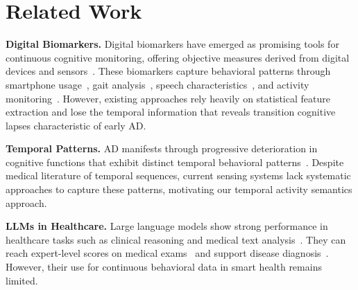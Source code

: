 \documentclass[sigconf, anonymous, 9pt, nonacm]{acmart}
\begin{document}
\vspace{-0.5em}

\section{Related Work}
\label{sec:related}

\noindent\textbf{Digital Biomarkers.}
Digital biomarkers have emerged as promising tools for continuous cognitive monitoring, offering objective measures derived from digital devices and sensors~\cite{Piau2019_DigBiomarkers,Qi2025DigitalBiomarkers}. These biomarkers capture behavioral patterns through smartphone usage~\cite{Dagum2018_DigitalBiomarkers,Nguyen2023_KeystrokeBiomarker}, gait analysis~\cite{Cepukaityte2024_GaitReview}, speech characteristics~\cite{Lin2020_VoiceBiomarkers,Noto2024_SpeechAD,Robin2021_SpeechCognitiveImpairment}, and activity monitoring~\cite{Chinner2018_DigitalAssessmentCognition}. However, existing approaches rely heavily on statistical feature extraction and lose the temporal information that reveals transition cognitive lapses characteristic of early AD.

\noindent\textbf{Temporal Patterns.}
AD manifests through progressive deterioration in cognitive functions that exhibit distinct temporal behavioral patterns~\cite{jack2010hypothetical,Jack2013_DynamicBiomarkersAD}.
 Despite medical literature of temporal sequences, current sensing systems lack systematic approaches to capture these patterns, motivating our temporal activity semantics approach.

\noindent\textbf{LLMs in Healthcare.}
Large language models show strong performance in healthcare tasks such as clinical reasoning and medical text analysis~\cite{Singhal2023ClinicalLLMs,Kwon2024_ReasoningLLM}. They can reach expert-level scores on medical exams~\cite{nori2023gpt4med,Singhal2025ExpertLLM} and support disease diagnosis~\cite{McDuff2025LLM_Diagnosis}. However, their use for continuous behavioral data in smart health remains limited.
\end{document}
